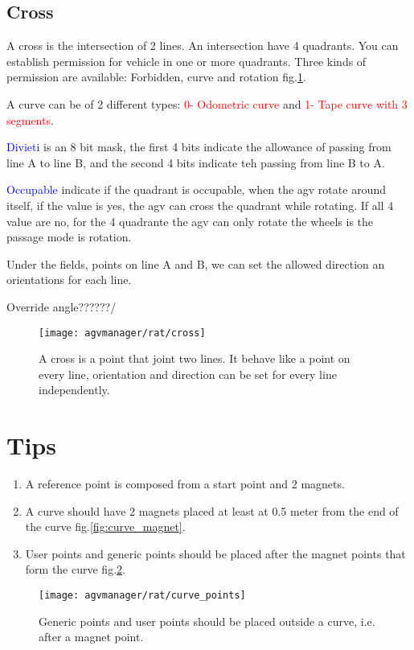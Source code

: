 %
\subsection{Cross}
A cross is the intersection of 2 lines. An intersection have 4 quadrants. You can establish permission for vehicle in one or more quadrants. Three kinds of permission are available: Forbidden, curve and rotation fig.\ref{fig:cross}.

A curve can be of 2 different types: \textcolor{red}{0- Odometric curve} and \textcolor{red}{1- Tape curve with 3 segments}.

\textcolor{blue}{Divieti} is an 8 bit mask, the first 4 bits indicate the allowance of passing from line A to line B, and the second 4 bits indicate teh passing from line B to A.

\textcolor{blue}{Occupable} indicate if the quadrant is occupable, when the agv rotate around itself, if the value is yes, the agv can cross the quadrant while rotating. If all 4 value are no, for the 4 quadrante the agv can only rotate the wheels is the passage mode is rotation.

Under the fields, points on line A and B, we can set the allowed direction an orientations for each line.

Override angle??????/

\begin{figure}[h]
	\centering\texttt{[image: agvmanager/rat/cross]}
	\caption{A cross is a point that joint two lines. It behave like a point on every line, orientation and direction can be set for every line independently.}
	\label{fig:cross}
\end{figure}

\section{Tips}
\begin{enumerate}
	\item A reference point is composed from a start point and 2 magnets.
	\item A curve should have 2 magnets placed at least at 0.5 meter from the end of the curve fig.\ref{fig:curve_magnet}.
	\item User points and generic points should be placed after the magnet points that form the curve fig.\ref{fig:curve_points}.
\end{enumerate}

\begin{figure}[h]
	\centering\texttt{[image: agvmanager/rat/curve\_points]}
	\caption{Generic points and user points should be placed outside a curve, i.e. after a magnet point.}
	\label{fig:curve_points}
\end{figure}




